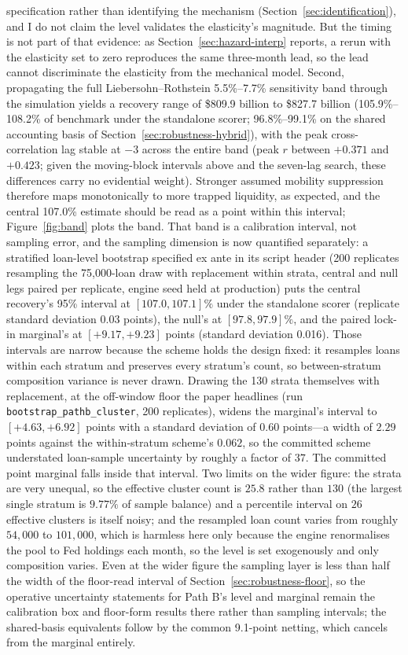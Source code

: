 \documentclass[12pt]{article}
\begin{document}
specification rather than identifying the mechanism (Section~\ref{sec:identification}), and I do not claim the level validates the elasticity's magnitude. But the timing is not part of that evidence: as Section~\ref{sec:hazard-interp} reports, a rerun with the elasticity set to zero reproduces the same three-month lead, so the lead cannot discriminate the elasticity from the mechanical model. Second, propagating the full Liebersohn--Rothstein 5.5\%--7.7\% sensitivity band through the simulation yields a recovery range of \$809.9 billion to \$827.7 billion (105.9\%--108.2\% of benchmark under the standalone scorer; 96.8\%--99.1\% on the shared accounting basis of Section~\ref{sec:robustness-hybrid}), with the peak cross-correlation lag stable at $-3$ across the entire band (peak $r$ between $+0.371$ and $+0.423$; given the moving-block intervals above and the seven-lag search, these differences carry no evidential weight). Stronger assumed mobility suppression therefore maps monotonically to more trapped liquidity, as expected, and the central 107.0\% estimate should be read as a point within this interval; Figure~\ref{fig:band} plots the band. That band is a calibration interval, not sampling error, and the sampling dimension is now quantified separately: a stratified loan-level bootstrap specified ex ante in its script header (200 replicates resampling the 75,000-loan draw with replacement within strata, central and null legs paired per replicate, engine seed held at production) puts the central recovery's 95\% interval at $[107.0, 107.1]\%$ under the standalone scorer (replicate standard deviation 0.03 points), the null's at $[97.8, 97.9]\%$, and the paired lock-in marginal's at $[+9.17, +9.23]$ points (standard deviation 0.016). Those intervals are narrow because the scheme holds the design fixed: it resamples loans within each stratum and preserves every stratum's count, so between-stratum composition variance is never drawn. Drawing the 130 strata themselves with replacement, at the off-window floor the paper headlines (run \texttt{bootstrap\_pathb\_cluster}, 200 replicates), widens the marginal's interval to $[+4.63, +6.92]$ points with a standard deviation of $0.60$ points---a width of $2.29$ points against the within-stratum scheme's $0.062$, so the committed scheme understated loan-sample uncertainty by roughly a factor of $37$. The committed point marginal falls inside that interval. Two limits on the wider figure: the strata are very unequal, so the effective cluster count is $25.8$ rather than $130$ (the largest single stratum is $9.77\%$ of sample balance) and a percentile interval on $26$ effective clusters is itself noisy; and the resampled loan count varies from roughly $54{,}000$ to $101{,}000$, which is harmless here only because the engine renormalises the pool to Fed holdings each month, so the level is set exogenously and only composition varies. Even at the wider figure the sampling layer is less than half the width of the floor-read interval of Section~\ref{sec:robustness-floor}, so the operative uncertainty statements for Path B's level and marginal remain the calibration box and floor-form results there rather than sampling intervals; the shared-basis equivalents follow by the common 9.1-point netting, which cancels from the marginal entirely.
\end{document}
